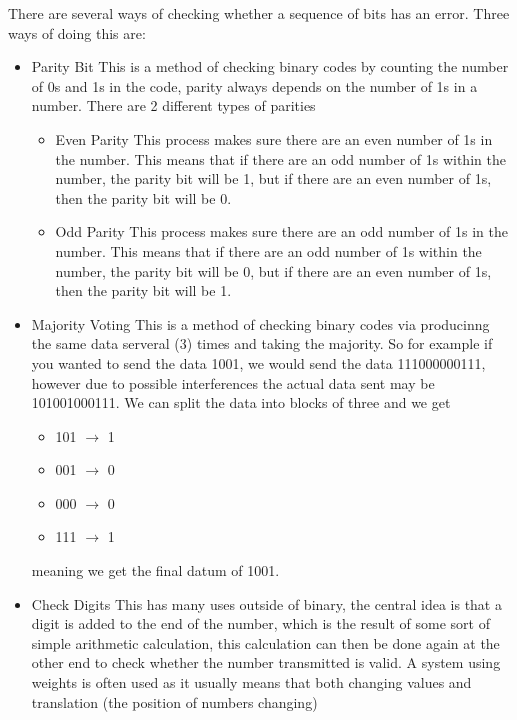   There are several ways of checking whether a sequence of bits has an error. Three ways of doing this are:
  \begin{itemize}
    \setlength{\itemsep}{0em}
    \item Parity Bit
      \subitem This is a method of checking binary codes by counting the number of 0s and 1s in the code, parity always depends on the number of 1s in a number. There are 2 different types of parities
      \begin{itemize}
        \setlength{\itemsep}{0em}
        \item Even Parity
          \subitem This process makes sure there are an even number of 1s in the number. This means that if there are an odd number of 1s within the number, the parity bit will be 1, but if there are an even number of 1s, then the parity bit will be 0.
        \item Odd Parity
          \subitem This process makes sure there are an odd number of 1s in the number. This means that if there are an odd number of 1s within the number, the parity bit will be 0, but if there are an even number of 1s, then the parity bit will be 1.
      \end{itemize}
    \item Majority Voting
      \subitem This is a method of checking binary codes via producinng the same data serveral (3) times and taking the majority. So for example if you wanted to send the data 1001, we would send the data 111000000111, however due to possible interferences the actual data sent may be 101001000111. We can split the data into blocks of three and we get
      \begin{itemize}
        \setlength{\itemsep}{0em}
        \item 101 $\to$ 1
        \item 001 $\to$ 0
        \item 000 $\to$ 0
        \item 111 $\to$ 1
      \end{itemize}
      \subitem meaning we get the final datum of 1001.
    \item Check Digits
      \subitem This has many uses outside of binary, the central idea is that a digit is added to the end of the number, which is the result of some sort of simple arithmetic calculation, this calculation can then be done again at the other end to check whether the number transmitted is valid. A system using weights is often used as it usually means that both changing values and translation (the position of numbers changing)
  \end{itemize}
